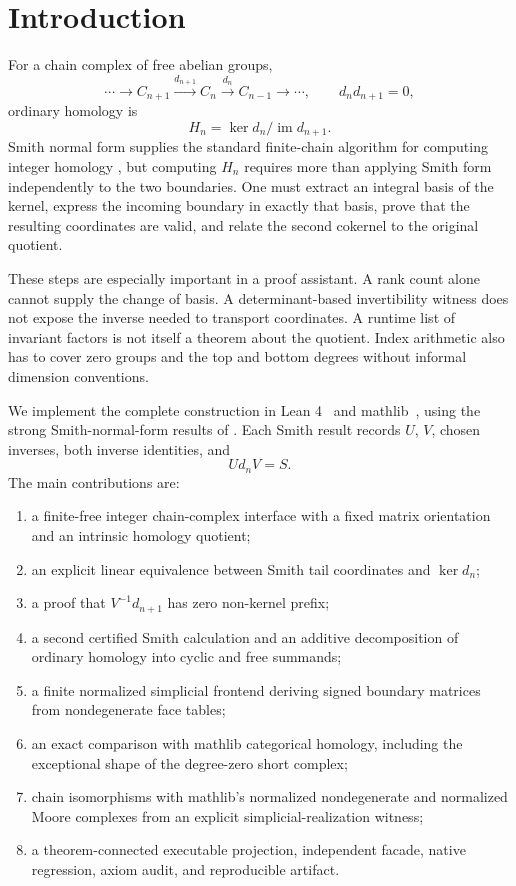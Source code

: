 \section{Introduction}

For a chain complex of free abelian groups,
\[
  \cdots \longrightarrow C_{n+1}
  \xrightarrow{d_{n+1}} C_n
  \xrightarrow{d_n} C_{n-1}\longrightarrow\cdots,
  \qquad d_nd_{n+1}=0,
\]
ordinary homology is
\[
  H_n=\ker d_n/\operatorname{im}d_{n+1}.
\]
Smith normal form supplies the standard finite-chain algorithm for computing
integer homology \citep[Chapter 3]{kaczynskiMischaikowMrozek2004}, but computing
$H_n$ requires more than applying Smith form independently to the two
boundaries.  One must extract an integral basis of the kernel, express the
incoming boundary in exactly that basis, prove that the resulting
coordinates are valid, and relate the second cokernel to the original
quotient.

These steps are especially important in a proof assistant.  A rank count
alone cannot supply the change of basis.  A determinant-based invertibility
witness does not expose the inverse needed to transport coordinates.  A
runtime list of invariant factors is not itself a theorem about the quotient.
Index arithmetic also has to cover zero groups and the top and bottom
degrees without informal dimension conventions.

We implement the complete construction in Lean 4~\citep{deMouraUllrich2021Lean4}
and mathlib~\citep{mathlib2020}, using the strong Smith-normal-form results
of .  Each Smith result records $U$, $V$, chosen
inverses, both inverse identities, and
\[
  Ud_nV=S.
\]
The main contributions are:

\begin{enumerate}
\item a finite-free integer chain-complex interface with a fixed matrix
  orientation and an intrinsic homology quotient;
\item an explicit linear equivalence between Smith tail coordinates and
  $\ker d_n$;
\item a proof that $V^{-1}d_{n+1}$ has zero non-kernel prefix;
\item a second certified Smith calculation and an additive decomposition of
  ordinary homology into cyclic and free summands;
\item a finite normalized simplicial frontend deriving signed boundary
  matrices from nondegenerate face tables;
\item an exact comparison with mathlib categorical homology, including the
  exceptional shape of the degree-zero short complex;
\item chain isomorphisms with mathlib's normalized nondegenerate and
  normalized Moore complexes from an explicit simplicial-realization
  witness;
\item a theorem-connected executable projection, independent facade, native
  regression, axiom audit, and reproducible artifact.
\end{enumerate}

